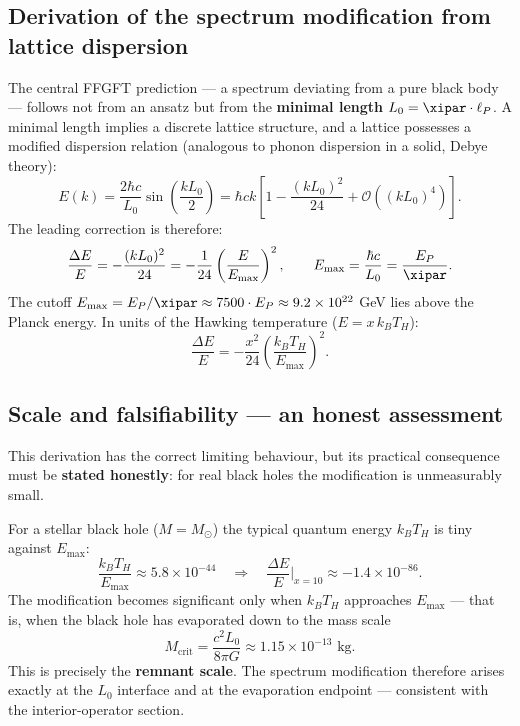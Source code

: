 \subsection{Derivation of the spectrum modification from lattice dispersion}

The central FFGFT prediction --- a spectrum deviating from a pure black body --- follows not from an ansatz but from the \textbf{minimal length} $L_0 = \xipar \cdot \ell_P$. A minimal length implies a discrete lattice structure, and a lattice possesses a modified dispersion relation (analogous to phonon dispersion in a solid, Debye theory):
\begin{equation}
  E(k) = \frac{2\hbar c}{L_0} \sin\!\left(\frac{k L_0}{2}\right)
       = \hbar c k \left[1 - \frac{(k L_0)^2}{24} + \mathcal{O}\!\left((kL_0)^4\right)\right].
\end{equation}
The leading correction is therefore:
\begin{equation}
  \frac{\Delta E}{E} = -\frac{(k L_0)^2}{24}
  = -\frac{1}{24}\left(\frac{E}{E_\text{max}}\right)^2,
  \qquad E_\text{max} = \frac{\hbar c}{L_0} = \frac{E_P}{\xipar}.
\end{equation}
The cutoff $E_\text{max} = E_P/\xipar \approx 7500 \cdot E_P \approx 9.2 \times 10^{22}$ GeV lies above the Planck energy. In units of the Hawking temperature ($E = x \, k_B T_H$):
\begin{equation}
  \frac{\Delta E}{E} = -\frac{x^2}{24}\left(\frac{k_B T_H}{E_\text{max}}\right)^2.
\end{equation}

\subsection{Scale and falsifiability --- an honest assessment}

This derivation has the correct limiting behaviour, but its practical consequence must be \textbf{stated honestly}: for real black holes the modification is unmeasurably small.

For a stellar black hole ($M = M_\odot$) the typical quantum energy $k_B T_H$ is tiny against $E_\text{max}$:
\begin{equation}
  \frac{k_B T_H}{E_\text{max}} \approx 5.8 \times 10^{-44}
  \quad\Rightarrow\quad
  \frac{\Delta E}{E}\bigg|_{x=10} \approx -1.4 \times 10^{-86}.
\end{equation}
The modification becomes significant only when $k_B T_H$ approaches $E_\text{max}$ --- that is, when the black hole has evaporated down to the mass scale
\begin{equation}
  M_\text{crit} = \frac{c^2 L_0}{8\pi G} \approx 1.15 \times 10^{-13} \text{ kg}.
\end{equation}
This is precisely the \textbf{remnant scale}. The spectrum modification therefore arises exactly at the $L_0$ interface and at the evaporation endpoint --- consistent with the interior-operator section.

